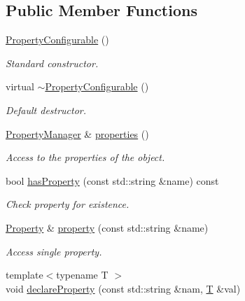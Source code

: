 \subsection*{Public Member Functions}
\begin{DoxyCompactItemize}
\item 
\hyperlink{class_d_d4hep_1_1_property_configurable_a06572f4bb82632232b0b503f56fda784}{PropertyConfigurable} ()
\begin{DoxyCompactList}\small\item\em Standard constructor. \item\end{DoxyCompactList}\item 
virtual \hyperlink{class_d_d4hep_1_1_property_configurable_a49ef91ca6bbdf3f9d835e5f18f3a3a27}{$\sim$PropertyConfigurable} ()
\begin{DoxyCompactList}\small\item\em Default destructor. \item\end{DoxyCompactList}\item 
\hyperlink{class_d_d4hep_1_1_property_manager}{PropertyManager} \& \hyperlink{class_d_d4hep_1_1_property_configurable_af6f3ad08d1cb9d831d8f89255c403d1c}{properties} ()
\begin{DoxyCompactList}\small\item\em Access to the properties of the object. \item\end{DoxyCompactList}\item 
bool \hyperlink{class_d_d4hep_1_1_property_configurable_a8c9ca33891ffe0f45045d31a9883e90c}{hasProperty} (const std::string \&name) const 
\begin{DoxyCompactList}\small\item\em Check property for existence. \item\end{DoxyCompactList}\item 
\hyperlink{class_d_d4hep_1_1_property}{Property} \& \hyperlink{class_d_d4hep_1_1_property_configurable_a810b7f58ab8fd70666d59c42792f508d}{property} (const std::string \&name)
\begin{DoxyCompactList}\small\item\em Access single property. \item\end{DoxyCompactList}\item 
{\footnotesize template$<$typename T $>$ }\\void \hyperlink{class_d_d4hep_1_1_property_configurable_af643f6873cc19432e566ecc1ba494c1d}{declareProperty} (const std::string \&nam, \hyperlink{class_t}{T} \&val)

\end{DoxyCompactItemize}
